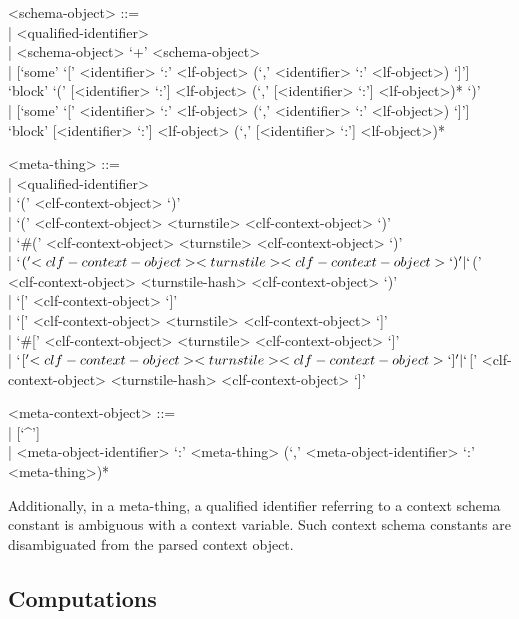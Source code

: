 \documentclass[11pt]{article}
\begin{document}
\begin{grammar}
<schema-object> ::= \hfill\\
| <qualified-identifier>\\
| <schema-object> `+' <schema-object>\\
| [`some' `[' <identifier> `:' <lf-object> (`,' <identifier> `:' <lf-object>) `]']\\
`block' `(' [<identifier> `:'] <lf-object> (`,' [<identifier> `:'] <lf-object>)* `)'\\
| [`some' `[' <identifier> `:' <lf-object> (`,' <identifier> `:' <lf-object>) `]']\\
`block' [<identifier> `:'] <lf-object> (`,' [<identifier> `:'] <lf-object>)*

<meta-thing> ::= \hfill\\
| <qualified-identifier>\\
| `(' <clf-context-object> `)'\\
| `(' <clf-context-object> <turnstile> <clf-context-object> `)'\\
| `#(' <clf-context-object> <turnstile> <clf-context-object> `)'\\
| `$(' <clf-context-object> <turnstile> <clf-context-object> `)'\\
| `$(' <clf-context-object> <turnstile-hash> <clf-context-object> `)'\\
| `[' <clf-context-object> `]'\\
| `[' <clf-context-object> <turnstile> <clf-context-object> `]'\\
| `#[' <clf-context-object> <turnstile> <clf-context-object> `]'\\
| `$[' <clf-context-object> <turnstile> <clf-context-object> `]'\\
| `$[' <clf-context-object> <turnstile-hash> <clf-context-object> `]'

<meta-context-object> ::= \hfill\\
| [`^']\\
| <meta-object-identifier> `:' <meta-thing> (`,' <meta-object-identifier> `:' <meta-thing>)*
\end{grammar}

Additionally, in a meta-thing, a qualified identifier referring to a context schema constant is ambiguous with a context variable.
Such context schema constants are disambiguated from the parsed context object.

\subsection{Computations}
\end{document}
